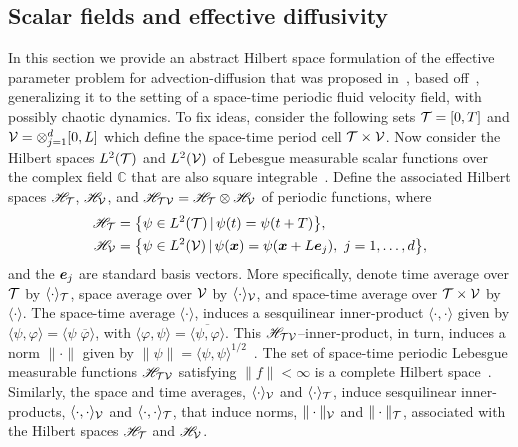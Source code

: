 \documentclass[amsa]{ipart}
\begin{document}
\subsection{Scalar fields and effective diffusivity}\label{app:Scalar_Fields}
%
In this section we provide an abstract Hilbert space formulation of
the effective parameter problem for advection-diffusion that was
proposed in~\cite{Pavliotis:PHD_Thesis}, based
off~\cite{Bhattacharya:AAP:1999:951}, generalizing it to the setting
of a space-time periodic fluid velocity field, with possibly chaotic
dynamics. To fix ideas, consider the following sets $\mathcal{T}=[0,T]$ and 
$\mathcal{V}=\otimes_{j=1}^d[0,L]$ which  define the space-time period cell
$\mathcal{T}\times\mathcal{V}$. Now consider the Hilbert spaces
$L^2(\mathcal{T})$ and $L^2(\mathcal{V})$ of Lebesgue measurable scalar functions over
the complex field $\mathbb{C}$ that are also square
integrable~\cite{Folland:99:RealAnalysis}. Define the associated
Hilbert spaces $\mathscr{H}_{\mathcal{T}}$, $\mathscr{H}_{\mathcal{V}}$, and
$\mathscr{H}_{\mathcal{T}\mathcal{V}}=\mathscr{H}_{\mathcal{T}}\otimes\mathscr{H}_{\mathcal{V}}$ of periodic functions, where  
%
\begin{align}\label{eq:Hilbert_Spaces_scalar}  
  \Hs_{\Tc}&=\big\{\psi\in L^2(\Tc) \, | \, \psi(t)=\psi(t+T)\big\},
  \\
  \Hs_{\Vc}&
  =\big\{\psi\in L^2(\Vc) \, | \, \psi(\vecx)=\psi(\vecx+L\vece_j), \ j=1,\ldots,d\big\},
  \notag
\end{align}
%
and the $\boldsymbol{e}_j$ are standard basis
vectors. More specifically, denote time average over $\mathcal{T}$ by
$\langle\cdot\rangle_{\mathcal{T}}$, space average over $\mathcal{V}$ by $\langle\cdot\rangle_{\mathcal{V}}$, and space-time
average over $\mathcal{T}\times\mathcal{V}$ by $\langle\cdot\rangle$. The space-time average $\langle\cdot\rangle$,
induces a sesquilinear inner-product $\langle\cdot,\cdot\rangle$ given by
$\langle\psi,\varphi\rangle=\langle\psi\;\overline{\varphi}\rangle$, with $\langle\varphi,\psi\rangle=\overline{\langle\psi,\varphi\rangle}$. This
$\mathscr{H}_{\mathcal{T}\mathcal{V}}$--inner-product, in turn, induces a norm $\|\cdot\|$ given by
$\|\psi\|=\langle\psi,\psi\rangle^{1/2}$~\cite{Folland:99:RealAnalysis}. The set of
space-time periodic
Lebesgue measurable functions $\mathscr{H}_{\mathcal{T}\mathcal{V}}$ satisfying $\|f\|<\infty$ is a
complete Hilbert space~\cite{Folland:99:RealAnalysis}. Similarly, the
space and time averages, 
$\langle\cdot\rangle_{\mathcal{V}}$ and $\langle\cdot\rangle_{\mathcal{T}}$, induce sesquilinear inner-products,
$\langle\cdot,\cdot\rangle_{\mathcal{V}}$ and $\langle\cdot,\cdot\rangle_{\mathcal{T}}$, that induce norms, $\|\cdot\|_{\mathcal{V}}$ and
$\|\cdot\|_{\mathcal{T}}$, associated with the Hilbert spaces $\mathscr{H}_{\mathcal{T}}$
and $\mathscr{H}_{\mathcal{V}}$. 
\end{document}
